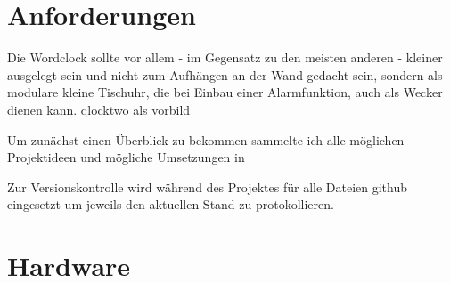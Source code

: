 \documentclass[12pt,journal,compsoc]{IEEEtran}
\begin{document}
\section{Anforderungen}
Die Wordclock sollte vor allem - im Gegensatz zu den meisten anderen - kleiner ausgelegt sein und nicht zum Aufhängen an der Wand gedacht sein, sondern als modulare kleine Tischuhr, die bei Einbau einer Alarmfunktion, auch als Wecker dienen kann.
qlocktwo als vorbild

Um zunächst einen Überblick zu bekommen sammelte ich alle möglichen Projektideen und mögliche Umsetzungen in


Zur Versionskontrolle wird während des Projektes für alle Dateien github eingesetzt um jeweils den aktuellen Stand zu protokollieren.



\section{Hardware}
\end{document}
